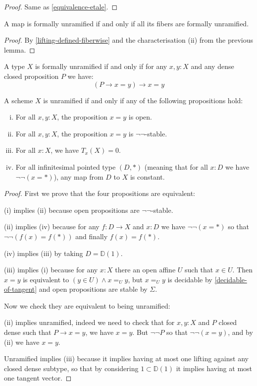 \begin{proof}
Same as \cref{equivalence-etale}.
\end{proof}

\begin{lemma}
A map is formally unramified if and only if all its fibers are formally unramified.
\end{lemma}

\begin{proof}
By \cref{lifting-defined-fiberwise} and the characterisation (ii) from the previous lemma.
\end{proof}

\begin{lemma}
A type $X$ is formally unramified if and only if for any $x,y:X$ and any dense closed proposition $P$ we have:
\[
(P\to x=y)\to x=y
\]
\end{lemma}

\begin{proposition}
A scheme $X$ is unramified if and only if any of the following propositions hold:
  \begin{enumerate}[(i)]
  \item For all $x,y:X$, the proposition $x=y$ is open.
  \item For all $x,y:X$, the proposition $x=y$ is $\neg\neg$-stable.
  \item For all $x:X$, we have $T_x(X)=0$.
  \item For all infinitesimal pointed type $(D,*)$ (meaning that for all $x:D$ we have $\neg\neg(x=*)$), any map from $D$ to $X$ is constant.
  \end{enumerate}
\end{proposition}

\begin{proof}
First we prove that the four propositions are equivalent:

(i) implies (ii) because open propositions are $\neg\neg$-stable.

(ii) implies (iv) because for any $f:D\to X$ and $x:D$ we have $\neg\neg(x=*)$ so that $\neg\neg(f(x)=f(*))$ and finally $f(x)=f(*)$.

(iv) implies (iii) by taking $D=\mathbb{D}(1)$.

(iii) implies (i) because for any $x:X$ there an open affine $U$ such that $x\in U$. Then $x=y$ is equivalent to $(y\in U)\land x=_U y$, but $x=_Uy$ is decidable by \cref{decidable-of-tangent} and open propositions are stable by $\Sigma$.

Now we check they are equivalent to being unramified:

(ii) implies unramified, indeed we need to check that for $x,y:X$ and $P$ closed dense such that $P\to x=y$, we have $x=y$. But $\neg\neg P$ so that $\neg\neg(x=y)$, and by (ii) we have $x=y$.

Unramified implies (iii) because it implies having at most one lifting against any closed dense subtype, so that by considering $1\subset \mathbb{D}(1)$ it implies having at most one tangent vector.
\end{proof}


